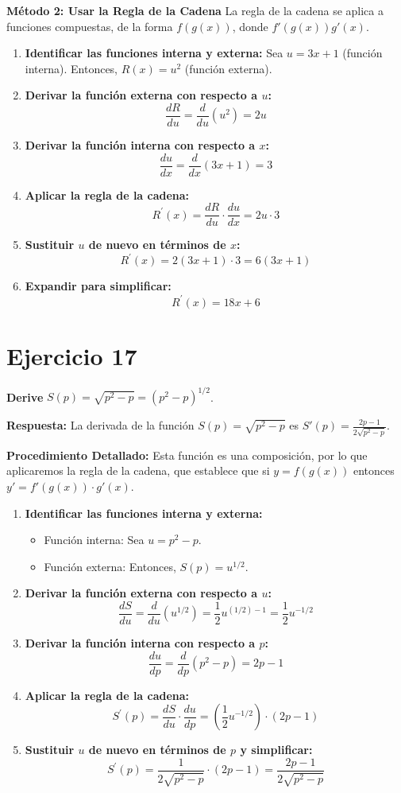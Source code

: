 \documentclass[12pt, a4paper]{article}
\begin{document}
\textbf{Método 2: Usar la Regla de la Cadena}
La regla de la cadena se aplica a funciones compuestas, de la forma $f(g(x))$, donde $f'(g(x))g'(x)$.
\begin{enumerate}
    \item \textbf{Identificar las funciones interna y externa:} Sea $u=3x+1$ (función interna). Entonces, $R(x)=u^2$ (función externa).
    \item \textbf{Derivar la función externa con respecto a $u$:}
    \[\frac{dR}{du}=\frac{d}{du}(u^2)=2u\]
    \item \textbf{Derivar la función interna con respecto a $x$:}
    \[\frac{du}{dx}=\frac{d}{dx}(3x+1)=3\]
    \item \textbf{Aplicar la regla de la cadena:}
    \[R^{\prime}(x)=\frac{dR}{du} \cdot \frac{du}{dx}=2u \cdot 3\]
    \item \textbf{Sustituir $u$ de nuevo en términos de $x$:}
    \[R^{\prime}(x)=2(3x+1) \cdot 3=6(3x+1)\]
    \item \textbf{Expandir para simplificar:}
    \[R^{\prime}(x)=18x+6\]
\end{enumerate}

\section{Ejercicio 17}
\textbf{Derive} $S(p)=\sqrt{p^2-p}=(p^2-p)^{1/2}$.

\textbf{Respuesta:}
La derivada de la función $S(p)=\sqrt{p^2-p}$ es $S'(p)=\frac{2p-1}{2\sqrt{p^2-p}}$.

\textbf{Procedimiento Detallado:}
Esta función es una composición, por lo que aplicaremos la regla de la cadena, que establece que si $y=f(g(x))$ entonces $y'=f'(g(x)) \cdot g'(x)$.
\begin{enumerate}
    \item \textbf{Identificar las funciones interna y externa:}
    \begin{itemize}
        \item Función interna: Sea $u=p^2-p$.
        \item Función externa: Entonces, $S(p)=u^{1/2}$.
    \end{itemize}
    \item \textbf{Derivar la función externa con respecto a $u$:}
    \[\frac{dS}{du}=\frac{d}{du}(u^{1/2})=\frac{1}{2}u^{(1/2)-1}=\frac{1}{2}u^{-1/2}\]
    \item \textbf{Derivar la función interna con respecto a $p$:}
    \[\frac{du}{dp}=\frac{d}{dp}(p^2-p)=2p-1\]
    \item \textbf{Aplicar la regla de la cadena:}
    \[S^{\prime}(p)= \frac{dS}{du} \cdot \frac{du}{dp} = \left(\frac{1}{2}u^{-1/2}\right)\cdot (2p-1)\]
    \item \textbf{Sustituir $u$ de nuevo en términos de $p$ y simplificar:}
    \[S^{\prime}(p)=\frac{1}{2\sqrt{p^2-p}}\cdot(2p-1)=\frac{2p-1}{2\sqrt{p^2-p}}\]
\end{enumerate}
\end{document}
